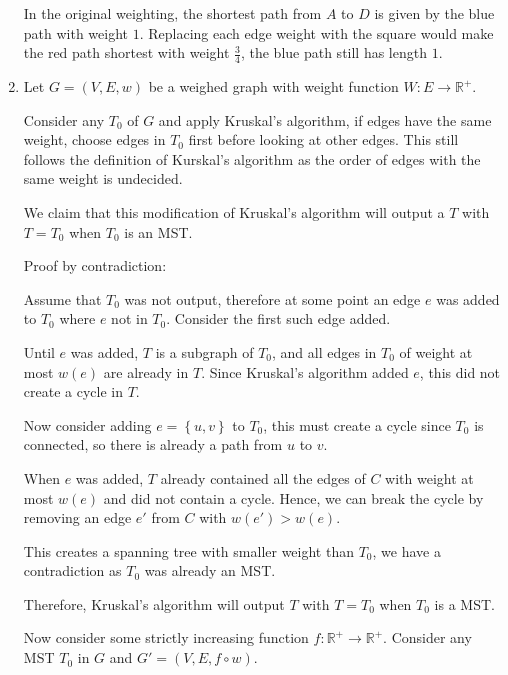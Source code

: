 \documentclass[a4paper, 11pt]{article}
\newcommand{\RR}{\mathbb{R}}
\def\set#1{\left\{ #1 \right\}}
\begin{document}
\begin{multicols*}{2}
\begin{enumerate}[label=(\alph*)]
\begin{center}
		      \end{center}
		      In the original weighting, the shortest path from $A$ to $D$ is given by the blue path with weight $1$. Replacing each edge weight with the square would make the red path shortest with weight $\frac 34$, the blue path still has length $1$.

		      \pagebreak
		\item

		      Let $G=(V,E,w)$ be a weighed graph with weight function $W:E\to\RR^+$.

		      Consider any $T_0$ of $G$ and apply Kruskal's algorithm, if edges have the same weight, choose edges in $T_0$ first before looking at other edges. This still follows the definition of Kurskal's algorithm as the order of edges with the same weight is undecided.

		      We claim that this modification of Kruskal's algorithm will output a $T$ with $T=T_0$ when $T_0$ is an MST.

		      Proof by contradiction:

		      \begin{mdframed}
			      Assume that $T_0$ was not output, therefore at some point an edge $e$ was added to $T_0$ where $e$ not in $T_0$. Consider the first such edge added.

			      Until $e$ was added, $T$ is a subgraph of $T_0$, and all edges in $T_0$ of weight at most $w(e)$ are already in $T$. Since Kruskal's algorithm added $e$, this did not create a cycle in $T$.

			      Now consider adding $e=\set{u,v}$ to $T_0$, this must create a cycle since $T_0$ is connected, so there is already a path from $u$ to $v$.

			      When $e$ was added, $T$ already contained all the edges of $C$ with weight at most $w(e)$ and did not contain a cycle. Hence, we can break the cycle by removing an edge $e'$ from $C$ with $w(e')>w(e)$.

			      This creates a spanning tree with smaller weight than $T_0$, we have a contradiction as $T_0$ was already an MST.

			      Therefore, Kruskal's algorithm will output $T$ with $T=T_0$ when $T_0$ is a MST.
		      \end{mdframed}

		      Now consider some strictly increasing function $f:\RR^+\to\RR^+$. Consider any MST $T_0$ in $G$ and $G'=(V,E,f\circ w)$.


\end{enumerate}
\end{multicols*}
\end{document}
